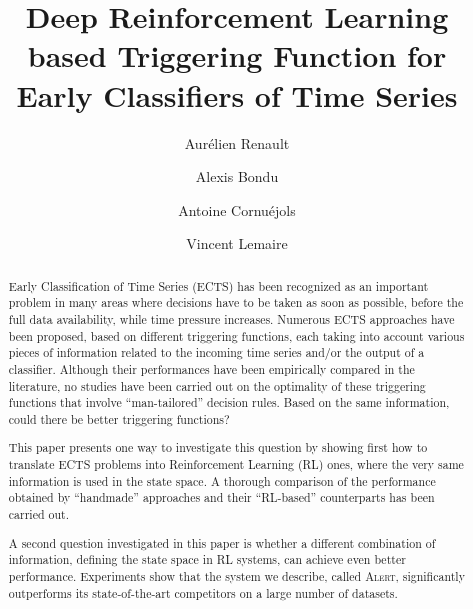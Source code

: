 \documentclass[sigconf, nonacm, table]{acmart}
\begin{document}
\title{Deep Reinforcement Learning based Triggering Function \newline
for Early Classifiers of Time Series}

\author{Aurélien Renault}


\author{Alexis Bondu}


\author{Antoine Cornuéjols}

\author{Vincent Lemaire}

\renewcommand{\shortauthors}{Renault et al.}

\begin{abstract}

Early Classification of Time Series (ECTS) has been recognized as an important problem in many areas where decisions have to be taken as soon as possible, before the full data availability, while time pressure increases. Numerous ECTS  approaches have been proposed, based on different triggering functions, each taking into account various pieces of information related to the incoming time series and/or the output of a classifier. Although their performances have been empirically compared in the literature, no studies have been carried out on the optimality of these triggering functions that involve ``man-tailored'' decision rules. Based on the same information, could there be better triggering functions? 


This paper presents one way to investigate this question by showing first how to translate ECTS problems into Reinforcement Learning (RL) ones, where the very same information is used in the state space. A thorough comparison of the performance obtained by ``handmade'' approaches and their ``RL-based'' counterparts has been carried out.

A second question investigated in this paper is whether a different combination of information, defining the state space in RL systems, can achieve even better performance. Experiments show that the system we describe, called \textsc{Alert}, significantly outperforms its state-of-the-art competitors on a large number of datasets.

  
\end{abstract}
\end{document}
